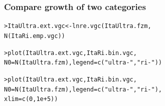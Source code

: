 \documentclass[handout,notes=show,t]{beamer} %
\begin{document}























\begin{frame}[fragile]
  \frametitle{Compare growth of two categories}
\begin{alltt}

> ItaUltra.ext.vgc <- lnre.vgc(ItaUltra.fzm,
  N(ItaRi.emp.vgc))


> plot(ItaUltra.ext.vgc, ItaRi.bin.vgc,
  N0=N(ItaUltra.fzm), legend=c("ultra-","ri-"))


> plot(ItaUltra.ext.vgc, ItaRi.bin.vgc,
  N0=N(ItaUltra.fzm), legend=c("ultra-","ri-"),
  xlim=c(0,1e+5))
\end{alltt}
\end{frame}
\end{document}
